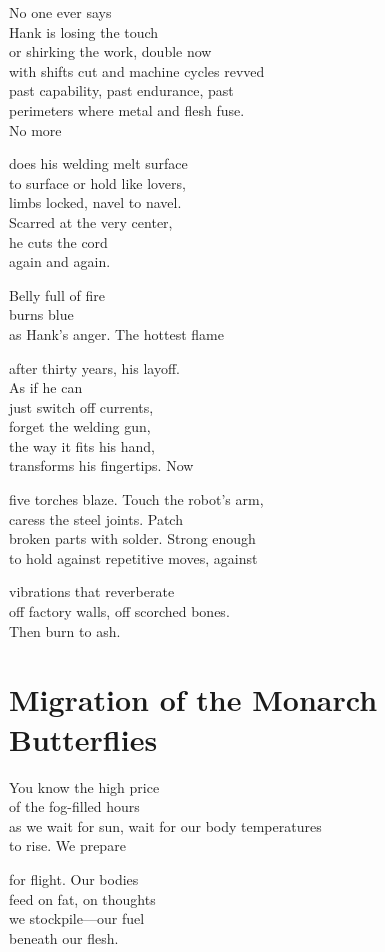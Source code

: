 \documentclass[twoside,10pt]{book}
\begin{document}
No one ever says\\
Hank is losing the touch\\
or shirking the work, double now\\
with shifts cut and machine cycles revved\\
past capability, past endurance, past\\
perimeters where metal and flesh fuse.\\
No more

does his welding melt surface\\
to surface or hold like lovers,\\
limbs locked, navel to navel.\\
Scarred at the very center,\\
he cuts the cord\\
again and again.

Belly full of fire\\
burns blue\\
as Hank's anger. The hottest flame

after thirty years, his layoff.\\
As if he can\\
just switch off currents,\\
forget the welding gun,\\
the way it fits his hand,\\
transforms his fingertips. Now

five torches blaze. Touch the robot's arm,\\
caress the steel joints. Patch\\
broken parts with solder. Strong enough\\
to hold against repetitive moves, against

vibrations that reverberate\\
off factory walls, off scorched bones.\\
Then burn to ash.


\clearpage
\section{Migration of the Monarch Butterflies}

You know the high price\\
of the fog-filled hours\\
as we wait for sun, wait for our body temperatures\\
to rise. We prepare

for flight. Our bodies\\
feed on fat, on thoughts\\
we stockpile---our fuel\\
beneath our flesh.
\end{document}
